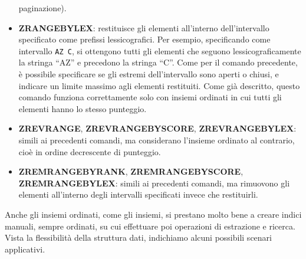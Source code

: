 \begin{itemize}
	paginazione).
	\item \textbf{ZRANGEBYLEX}: restituisce gli elementi all'interno dell'intervallo specificato
	come prefissi lessicografici. Per esempio, specificando come intervallo \verb|AZ C|, si
	ottengono tutti gli elementi che seguono lessicograficamente la stringa ``AZ'' e precedono la
	stringa ``C''. Come per il comando precedente, è possibile specificare se gli estremi
	dell'intervallo sono aperti o chiusi, e indicare un limite massimo agli elementi restituiti.
	Come già descritto, questo comando funziona correttamente solo con insiemi ordinati in cui
	tutti gli elementi hanno lo stesso punteggio.
	\item \textbf{ZREVRANGE}, \textbf{ZREVRANGEBYSCORE}, \textbf{ZREVRANGEBYLEX}: simili ai
	precedenti comandi, ma considerano l'insieme ordinato al contrario, cioè in ordine decrescente
	di punteggio.
	\item \textbf{ZREMRANGEBYRANK}, \textbf{ZREMRANGEBYSCORE}, \textbf{ZREMRANGEBYLEX}: simili ai
	precedenti comandi, ma rimuovono gli elementi all'interno degli intervalli specificati invece
	che restituirli.
\end{itemize}

Anche gli insiemi ordinati, come gli insiemi, si prestano molto bene a creare indici manuali,
sempre ordinati, su cui effettuare poi operazioni di estrazione e ricerca. Vista la flessibilità
della struttura dati, indichiamo alcuni possibili scenari applicativi.

